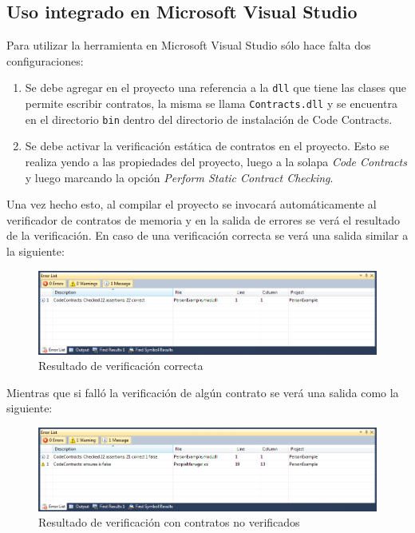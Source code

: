 \documentclass[12pt,a4paper]{article}
\newcommand\mono[1]{\texttt{#1}}
\begin{document}
		\subsection{Uso integrado en Microsoft Visual Studio}
			Para utilizar la herramienta en Microsoft Visual Studio sólo hace falta dos configuraciones:
			\begin{enumerate}
				\item Se debe agregar en el proyecto una referencia a la \mono{dll} que tiene las clases que permite escribir contratos, la misma se llama \mono{Contracts.dll} y se encuentra en el directorio \mono{bin} dentro del directorio de instalación de Code Contracts.
				\item Se debe activar la verificación estática de contratos en el proyecto. Esto se realiza yendo a las propiedades del proyecto, luego a la solapa \textit{Code Contracts} y luego marcando la opción \textit{Perform Static Contract Checking}.
			\end{enumerate}

			Una vez hecho esto, al compilar el proyecto se invocará automáticamente al verificador de contratos de memoria y en la salida de errores se verá el resultado de la verificación. En caso de una verificación correcta se verá una salida similar a la siguiente:

			\begin{figure}[htb]
			\begin{center}
			\includegraphics[scale=0.5]{vs_verif_ok.png}
			\end{center}
			\caption{Resultado de verificación correcta}
			\end{figure}

			Mientras que si falló la verificación de algún contrato se verá una salida como la siguiente:

			\begin{figure}[htb]
			\begin{center}
			\includegraphics[scale=0.5]{vs_verif_err.png}
			\end{center}
			\caption{Resultado de verificación con contratos no verificados}
			\end{figure}
\end{document}
